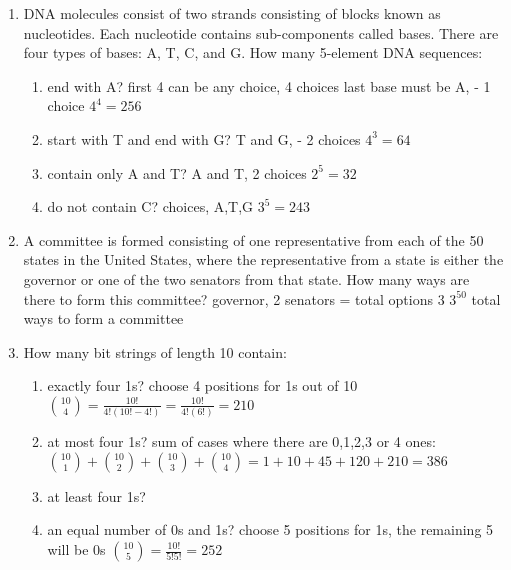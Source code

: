 \documentclass{article}
\begin{document}
\begin{enumerate}
\begin{enumerate}
		\end{enumerate}
		
		\item DNA molecules consist of two strands consisting of blocks known as nucleotides. Each nucleotide contains sub-components called bases. There are four types of bases: A, T, C, and G. How many 5-element DNA sequences:
		\begin{enumerate}
			\item end with A?
			\subitem first 4 can be any choice, 4 choices
			\subitem last base must be A,  - 1 choice 
			\subitem $4^4 = 256$
			\item start with T and end with G?
			\subitem T and G, - 2 choices
			\subitem $4^3 = 64$
			\item contain only A and T?
			\subitem A and T, 2 choices 
			\subitem $2^5 = 32$ 
			\item do not contain C?
			 choices, A,T,G
			\subitem $3^5 = 243$
		\end{enumerate}
		
		\item A committee is formed consisting of one representative from each of the 50 states in the United States, where the representative from a state is either the governor or one of the two senators from that state. How many ways are there to form this committee?
		 governor, 2 senators = total options 3
		\subitem $3^50$ total ways to form a committee 
		
		\item How many bit strings of length 10 contain:
		\begin{enumerate}
			\item exactly four 1s?
			\subitem choose 4 positions for 1s out of 10
			\subitem $\binom{10}{4} = \frac{10!}{4!(10!-4!)} =\frac{10!}{4!(6!)} = 210 $
			\item at most four 1s?
			\subitem sum of cases where there are 0,1,2,3 or 4 ones:
			\subitem $\binom{10}{1}  + \binom{10}{2} + \binom{10}{3} + \binom{10}{4} = 1+10+45+120+210 = 386$
			\item at least four 1s?
			\item an equal number of 0s and 1s?
			\subitem choose 5 positions for 1s, the remaining 5 will be 0s
			\subitem $\binom{10}{5} = \frac{10!}{5!5!} = 252$
		\end{enumerate}
		

\end{enumerate}
\end{document}
